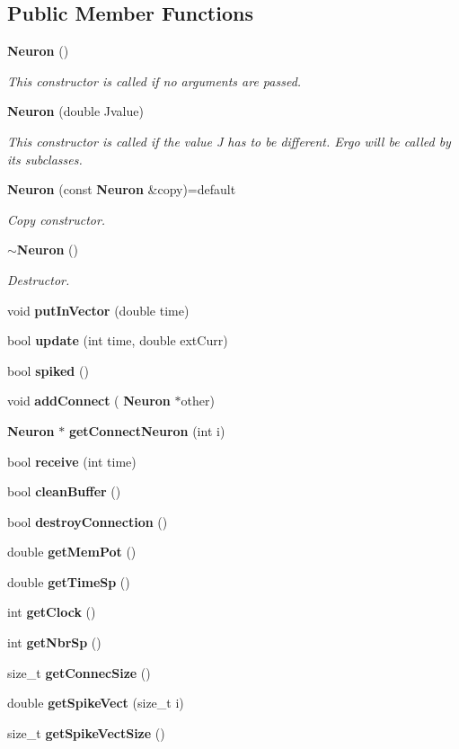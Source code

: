 \subsection*{Public Member Functions}
\begin{DoxyCompactItemize}
\item 
\textbf{ Neuron} ()
\begin{DoxyCompactList}\small\item\em This constructor is called if no arguments are passed. \end{DoxyCompactList}\item 
\textbf{ Neuron} (double Jvalue)
\begin{DoxyCompactList}\small\item\em This constructor is called if the value J has to be different. Ergo will be called by its subclasses. \end{DoxyCompactList}\item 
\textbf{ Neuron} (const \textbf{ Neuron} \&copy)=default
\begin{DoxyCompactList}\small\item\em Copy constructor. \end{DoxyCompactList}\item 
\textbf{ $\sim$\+Neuron} ()
\begin{DoxyCompactList}\small\item\em Destructor. \end{DoxyCompactList}\item 
void \textbf{ put\+In\+Vector} (double time)
\item 
bool \textbf{ update} (int time, double ext\+Curr)
\item 
bool \textbf{ spiked} ()
\item 
void \textbf{ add\+Connect} (\textbf{ Neuron} $\ast$other)
\item 
\textbf{ Neuron} $\ast$ \textbf{ get\+Connect\+Neuron} (int i)
\item 
bool \textbf{ receive} (int time)
\item 
bool \textbf{ clean\+Buffer} ()
\item 
bool \textbf{ destroy\+Connection} ()
\item 
double \textbf{ get\+Mem\+Pot} ()
\item 
double \textbf{ get\+Time\+Sp} ()
\item 
int \textbf{ get\+Clock} ()
\item 
int \textbf{ get\+Nbr\+Sp} ()
\item 
size\+\_\+t \textbf{ get\+Connec\+Size} ()
\item 
double \textbf{ get\+Spike\+Vect} (size\+\_\+t i)
\item 
size\+\_\+t \textbf{ get\+Spike\+Vect\+Size} ()
\end{DoxyCompactItemize}


